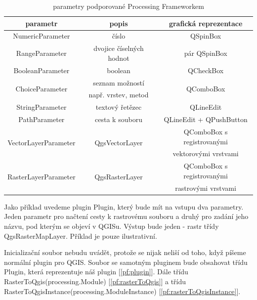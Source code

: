 \begin{table}	
	\centering
	\begin{tabular}{|c|c|c|}
		\hline
		\textbf{parametr} & \textbf{popis} & \textbf{grafická reprezentace}\\
		\hline
		\hline
		NumericParameter & číslo & QSpinBox\\
		\hline
		RangeParameter & dvojice číselných hodnot & pár QSpinBox\\	
		\hline
		BooleanParameter & boolean & QCheckBox\\		
		\hline
		\multirow{2}{*}{ChoiceParameter} & seznam možností & \multirow{2}{*}{QComboBox}\\
		& např. vrstev, metod & \\
		\hline
		StringParameter & textový řetězec & QLineEdit \\
		\hline
		PathParameter & cesta k souboru & QLineEdit + QPushButton \\
		\hline
		\multirow{2}{*}{VectorLayerParameter} & \multirow{2}{*}{QgsVectorLayer} & QComboBox s registrovanými \\
		& & vektorovými vrstvami\\
		\hline
		\multirow{2}{*}{RasterLayerParameter} & \multirow{2}{*}{QgsRasterLayer} & QComboBox s registrovanými \\
		& & rastrovými vrstvami\\		
		\hline	
	\end{tabular}
	\caption{parametry podporované Processing Frameworkem}
	\label{tab:pf_parametry}
\end{table}

Jako příklad uvedeme plugin Plugin, který bude mít na vstupu dva
parametry. Jeden parametr pro načtení cesty k rastrovému souboru a
druhý pro zadání jeho názvu, pod kterým se objeví v QGISu. Výstup bude
jeden - rastr třídy QgsRasterMapLayer. Příklad je pouze ilustrativní.

Inicializační soubor nebudu uvádět, protože se nijak neliší od toho,
když píšeme normální plugin pro QGIS. Soubor se samotným pluginem bude
obsahovat třídu Plugin, která reprezentuje náš plugin
[\autoref{pf:plugin}]. Dále třídu RasterToQgis(processing.\-Module)
[\autoref{pf:rasterToQgis}] a třídu
RasterToQgisInstance(processing.ModuleInstance)
[\autoref{pf:rasterToQgisInstance}].\\

